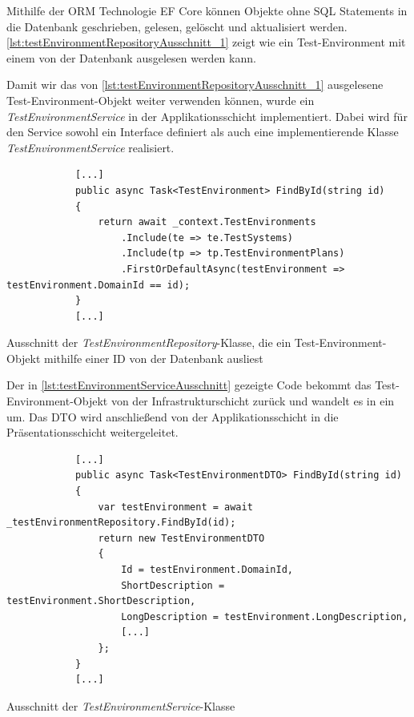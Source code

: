 \documentclass[a4paper, fontsize=11pt, parskip=half, twoside, headings=openright]{scrreprt}
\begin{document}
	Mithilfe der \ac{ORM} Technologie \ac{EF} Core können Objekte ohne \ac{SQL} Statements in die Datenbank geschrieben, gelesen, gelöscht und aktualisiert werden.
	\autoref{lst:testEnvironmentRepositoryAusschnitt_1} zeigt wie ein Test-Environment mit einem  von der Datenbank ausgelesen werden kann.
	
	Damit wir das von \autoref{lst:testEnvironmentRepositoryAusschnitt_1} ausgelesene Test-Environment-Objekt weiter verwenden können, wurde ein \emph{TestEnvironmentService} in der Applikationsschicht implementiert. 
	Dabei wird für den Service sowohl ein Interface definiert als auch eine implementierende Klasse \emph{TestEnvironmentService} realisiert.
	
	\begin{listing}[ht]
		\begin{verbatim}
			[...]		
			public async Task<TestEnvironment> FindById(string id)
			{
				return await _context.TestEnvironments
					.Include(te => te.TestSystems)
					.Include(tp => tp.TestEnvironmentPlans)
					.FirstOrDefaultAsync(testEnvironment => testEnvironment.DomainId == id);		
			}		
			[...]
		\end{verbatim}
		\caption{Ausschnitt der \emph{TestEnvironmentRepository}-Klasse, die ein Test-Environment-Objekt mithilfe einer \ac{ID} von der Datenbank ausliest}
		\label{lst:testEnvironmentRepositoryAusschnitt_1}
	\end{listing}
	
	Der in \autoref{lst:testEnvironmentServiceAusschnitt} gezeigte Code bekommt das Test-Environment-Objekt von der Infrastrukturschicht zurück und wandelt es in ein  um.
	Das \ac{DTO} wird anschließend von der Applikationsschicht in die Präsentationsschicht weitergeleitet.

	\begin{listing}[!htb]
		\begin{verbatim}
			[...]				
			public async Task<TestEnvironmentDTO> FindById(string id)
			{
				var testEnvironment = await _testEnvironmentRepository.FindById(id);	
				return new TestEnvironmentDTO
				{
					Id = testEnvironment.DomainId,
					ShortDescription = testEnvironment.ShortDescription,
					LongDescription = testEnvironment.LongDescription,
					[...]	
				};
			}			
			[...]
		\end{verbatim}
		\caption{Ausschnitt der \emph{TestEnvironmentService}-Klasse}
		\label{lst:testEnvironmentServiceAusschnitt}
	\end{listing}
\end{document}

